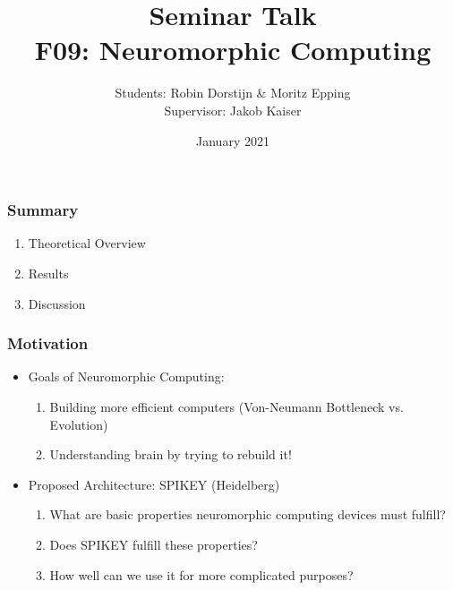 \documentclass{beamer}
\title{Seminar Talk \\ F09: Neuromorphic Computing}
\author{Students: Robin Dorstijn \& Moritz Epping \\ Supervisor: Jakob Kaiser}
\institute{Universität Heidelberg}
\date{January 2021}
\begin{document}
\frame{\titlepage}

\begin{frame}
    \frametitle{Summary}
    \begin{enumerate}
        \item Theoretical Overview
        \item Results
        \item Discussion
    \end{enumerate}
\end{frame}

\begin{frame}
    \frametitle{Motivation}
   	\begin{itemize}
   		\item Goals of Neuromorphic Computing:
   		\begin{enumerate}
   			\item Building more efficient computers (Von-Neumann Bottleneck vs.  Evolution)
   			\item  Understanding brain by trying to rebuild it!	
   		\end{enumerate}
   		\bigskip
   		\item Proposed Architecture: SPIKEY (Heidelberg)
   		\begin{enumerate}
   			\item What are basic properties neuromorphic computing devices must fulfill?
   			\item Does SPIKEY fulfill these properties?
   			\item How well can we use it for more complicated purposes?
   		\end{enumerate}
   	\end{itemize}
\end{frame}
\end{document}
